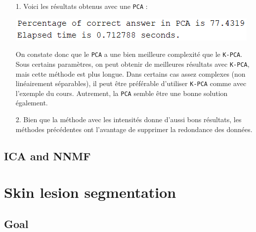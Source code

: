 \documentclass[a4paper, 11pt]{article}
\begin{document}
\begin{itemize}

	\item[1.] Voici les résultats obtenus avec une \texttt{PCA} :
	
\begin{center}
	\includegraphics[scale=0.9]{pca_perf.PNG}
\end{center}

On constate donc que le \texttt{PCA} a une bien meilleure complexité que le \texttt{K-PCA}. Sous certains paramètres, on peut obtenir de meilleures résultats avec \texttt{K-PCA}, mais cette méthode est plus longue. Dans certains cas assez complexes (non linéairement séparables), il peut être préférable d'utiliser \texttt{K-PCA} comme avec l'exemple du cours. Autrement, la \texttt{PCA} semble être une bonne solution également.

	\item[2.] Bien que la méthode avec les intensités donne d'aussi bons résultats, les méthodes précédentes ont l'avantage de supprimer la redondance des données. 

\end{itemize}

\subsection{ICA and NNMF}



\section{Skin lesion segmentation}

\subsection{Goal}
\end{document}
